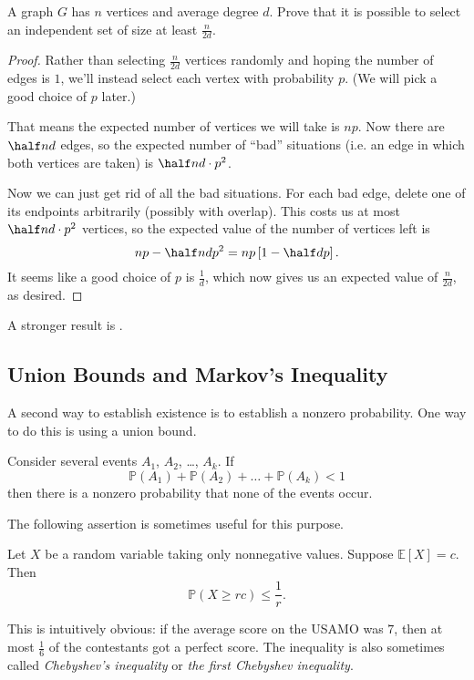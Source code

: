 \documentclass[11pt]{scrartcl}
\newcommand\EE{\mathbb E}
\newcommand\PP{\mathbb P}
\begin{document}
\begin{example}
   A graph $G$ has $n$ vertices and average degree $d$.
  Prove that it is possible to select an independent set of size at least $\frac{n}{2d}$.
\end{example}
\begin{proof}
  Rather than selecting $\frac{n}{2d}$ vertices randomly and hoping the number of edges is $1$,
  we'll instead select each vertex with probability $p$.
  (We will pick a good choice of $p$ later.)

  That means the expected number of vertices we will take is $np$.
  Now there are $\half nd$ edges, so the expected number of ``bad'' situations ({i.e.} an edge
  in which both vertices are taken) is $\half nd \cdot p^2$.

  Now we can just get rid of all the bad situations.
  For each bad edge, delete one of its endpoints arbitrarily (possibly with overlap).
  This costs us at most $\half nd \cdot p^2$ vertices, so the expected value
  of the number of vertices left is
  \[ np - \half nd p^2 = np \left[ 1 - \half dp \right]. \]
  It seems like a good choice of $p$ is $\frac 1d$, which now gives us an expected value
  of $\frac{n}{2d}$, as desired.
\end{proof}
A stronger result is .


\subsection{Union Bounds and Markov's Inequality}
A second way to establish existence is to establish a nonzero probability.
One way to do this is using a union bound.
\begin{proposition}
  Consider several events $A_1$, $A_2$, \dots, $A_k$.  If
  \[ \PP(A_1) + \PP(A_2) + \dots + \PP(A_k) < 1 \]
  then there is a nonzero probability that none of the events occur.
\end{proposition}

The following assertion is sometimes useful for this purpose.
\begin{theorem}
  Let $X$ be a random variable taking only nonnegative values.
  Suppose $\EE[X] = c$. Then
  \[ \PP(X \ge rc) \le \frac{1}{r} . \]
\end{theorem}
This is intuitively obvious: if the average score on the USAMO was $7$,
then at most $\frac 16$ of the contestants got a perfect score.
The inequality is also sometimes called \emph{Chebyshev's inequality} or
\emph{the first Chebyshev inequality}.
\end{document}
